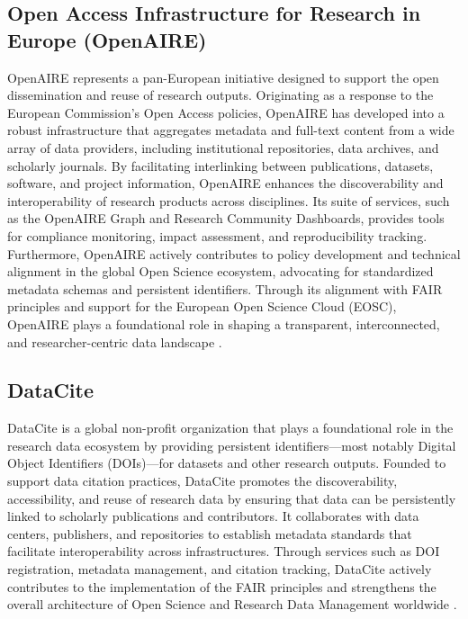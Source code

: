 \documentclass{article}
\begin{document}
\subsection{Open Access Infrastructure for Research in Europe (OpenAIRE)}
OpenAIRE represents a pan-European initiative designed to support the open dissemination and reuse of research outputs. Originating as a response to the European Commission's Open Access policies, OpenAIRE has developed into a robust infrastructure that aggregates metadata and full-text content from a wide array of data providers, including institutional repositories, data archives, and scholarly journals. By facilitating interlinking between publications, datasets, software, and project information, OpenAIRE enhances the discoverability and interoperability of research products across disciplines. Its suite of services, such as the OpenAIRE Graph and Research Community Dashboards, provides tools for compliance monitoring, impact assessment, and reproducibility tracking. Furthermore, OpenAIRE actively contributes to policy development and technical alignment in the global Open Science ecosystem, advocating for standardized metadata schemas and persistent identifiers. Through its alignment with FAIR principles and support for the European Open Science Cloud (EOSC), OpenAIRE plays a foundational role in shaping a transparent, interconnected, and researcher-centric data landscape \cite{rettberg_openaire_2012}.



\subsection{DataCite}

DataCite is a global non-profit organization that plays a foundational role in the research data ecosystem by providing persistent identifiers—most notably Digital Object Identifiers (DOIs)—for datasets and other research outputs. Founded to support data citation practices, DataCite promotes the discoverability, accessibility, and reuse of research data by ensuring that data can be persistently linked to scholarly publications and contributors. It collaborates with data centers, publishers, and repositories to establish metadata standards that facilitate interoperability across infrastructures. Through services such as DOI registration, metadata management, and citation tracking, DataCite actively contributes to the implementation of the FAIR principles and strengthens the overall architecture of Open Science and Research Data Management worldwide \cite{brase_datacite_2009}.
\end{document}
